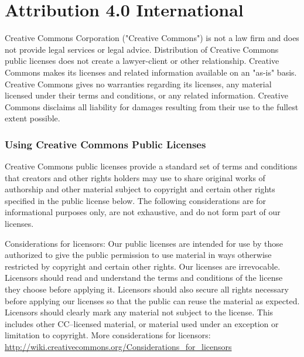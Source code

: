 \chapter{Attribution 4.0 International}
\label{license}

\begin{scriptsize}

Creative Commons Corporation ("Creative Commons") is not a law firm and
does not provide legal services or legal advice. Distribution of
Creative Commons public licenses does not create a lawyer-client or
other relationship. Creative Commons makes its licenses and related
information available on an "as-is" basis. Creative Commons gives no
warranties regarding its licenses, any material licensed under their
terms and conditions, or any related information. Creative Commons
disclaims all liability for damages resulting from their use to the
fullest extent possible.

\subsection*{Using Creative Commons Public Licenses}

Creative Commons public licenses provide a standard set of terms and
conditions that creators and other rights holders may use to share
original works of authorship and other material subject to copyright
and certain other rights specified in the public license below. The
following considerations are for informational purposes only, are not
exhaustive, and do not form part of our licenses.

     Considerations for licensors: Our public licenses are
     intended for use by those authorized to give the public
     permission to use material in ways otherwise restricted by
     copyright and certain other rights. Our licenses are
     irrevocable. Licensors should read and understand the terms
     and conditions of the license they choose before applying it.
     Licensors should also secure all rights necessary before
     applying our licenses so that the public can reuse the
     material as expected. Licensors should clearly mark any
     material not subject to the license. This includes other 
	CC--licensed material, or material used under an exception or
     limitation to copyright. More considerations for licensors:
		\url{http://wiki.creativecommons.org/Considerations_for_licensors}


\end{scriptsize}
